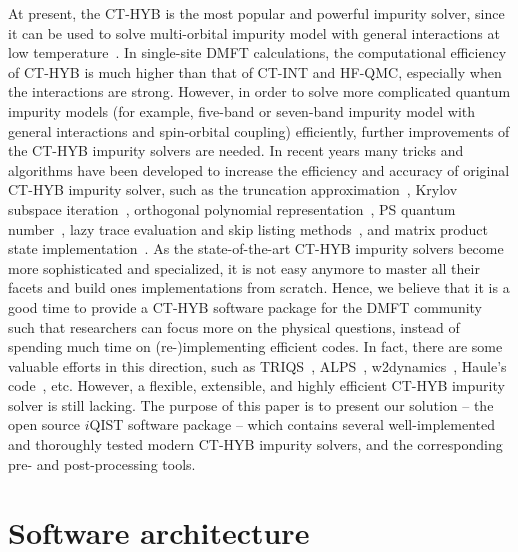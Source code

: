 At present, the CT-HYB is the most popular and powerful impurity solver, since it can be used to solve multi-orbital impurity model with general interactions at low temperature~\cite{RevModPhys.83.349}. In single-site DMFT calculations, the computational efficiency of CT-HYB is much higher than that of CT-INT and HF-QMC, especially when the interactions are  strong. However, in order to solve more complicated quantum impurity models (for example, five-band or seven-band impurity model with general interactions and spin-orbital coupling) efficiently, further improvements of the CT-HYB impurity solvers are needed. In recent years many tricks and algorithms have been developed to increase the efficiency and accuracy of original CT-HYB impurity solver, such as the truncation approximation~\cite{PhysRevB.75.155113}, Krylov subspace iteration~\cite{PhysRevB.80.235117}, orthogonal polynomial representation~\cite{PhysRevB.84.075145,PhysRevB.85.205106}, PS quantum number~\cite{PhysRevB.86.155158}, lazy trace evaluation and skip listing methods~\cite{arXiv:1403.7214}, and matrix product state implementation~\cite{1742-5468-2014-6-P06012}. As the state-of-the-art CT-HYB impurity solvers become more sophisticated and specialized, it is not easy anymore to master all their facets and build ones implementations from scratch. Hence, we believe that it is a good time to provide a CT-HYB software package for the DMFT community such that researchers can focus more on the physical questions, instead of spending much time on (re-)implementing efficient codes. In fact, there are some valuable efforts in this direction, such as TRIQS~\cite{triqs}, ALPS~\cite{1742-5468-2011-05-P05001}, w2dynamics~\cite{w2dynamics}, Haule's code~\cite{haule}, etc. However, a flexible, extensible, and highly efficient CT-HYB impurity solver is still lacking. The purpose of this paper is to present our solution -- the open source $i$QIST software package -- which contains several well-implemented and thoroughly tested modern CT-HYB impurity solvers, and the corresponding pre- and post-processing tools.

\section{Software architecture}

